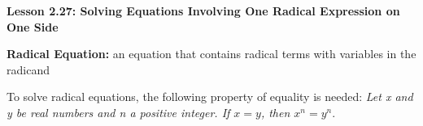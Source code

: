 \begin{center}
\textbf{Lesson 2.27: Solving Equations Involving One Radical Expression on One Side}
\end{center}

\vspace*{1ex}

\noindent \textbf{Radical Equation:} an equation that contains radical terms with variables in the radicand

To solve radical equations, the following property of equality is needed: \emph{Let x and y be real numbers and n a positive integer. If \(x=y\), then \(x^{n} = y^{n}\)}.


